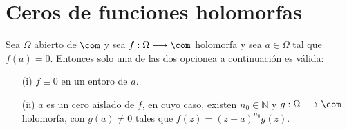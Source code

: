 \chapter{Ceros de funciones holomorfas}

\begin{teo}
Sea $\Omega$ abierto de $\com$ y sea $f: \Omega \longrightarrow \com$ holomorfa y sea $a \in \Omega$ tal que $f(a) = 0$. Entonces solo una de las dos opcionea a continuación es válida:
\begin{enumerate}
    \item[(i)] $f \equiv 0$ en un entoro de $a$.
    \item[(ii)] $a$ es un cero aislado de $f$, en cuyo caso, existen $n_0 \in \mathbb{N}$ y $g: \Omega \longrightarrow \com$ holomorfa, con $g(a) \not = 0$ tales que $f(z) = (z-a)^{n_0}g(z)$.
\end{enumerate}
\end{teo}

